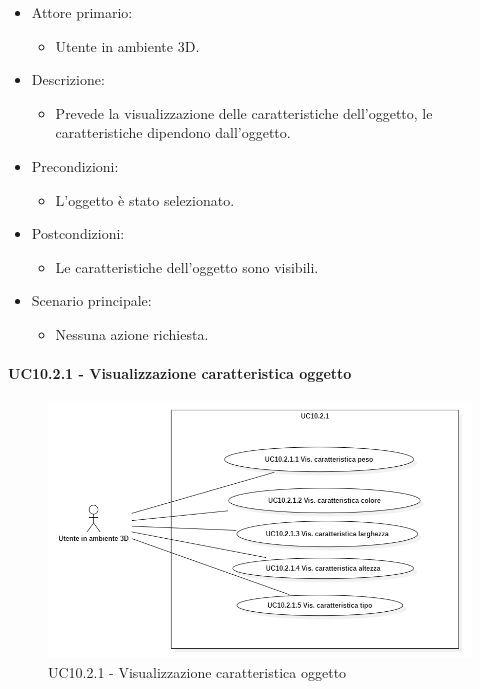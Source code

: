 \begin{itemize}
	
	\item Attore primario: 
	\begin{itemize}
		\item Utente in ambiente 3D.
	\end{itemize}
	\item Descrizione:
	\begin{itemize}
		\item Prevede la visualizzazione delle caratteristiche dell'oggetto, le caratteristiche dipendono dall'oggetto.
	\end{itemize}
	
	\item Precondizioni:
	\begin{itemize}
		\item L'oggetto è stato selezionato.
	\end{itemize}
	
	\item Postcondizioni:
	\begin{itemize}
		\item Le caratteristiche dell'oggetto sono visibili.
	\end{itemize}
	
	\item Scenario principale:
	\begin{itemize}
		\item Nessuna azione richiesta.
	\end{itemize}
	
\end{itemize}

\paragraph{UC10.2.1 - Visualizzazione caratteristica oggetto}

\begin{figure}[H]
  \renewcommand{\thefigure}{15}
  \includegraphics[width=\linewidth]{./res/images/UC10.2.1.png}
  \caption{UC10.2.1 - Visualizzazione caratteristica oggetto}
  \label{fig:UC 10.2.1}
\end{figure}

